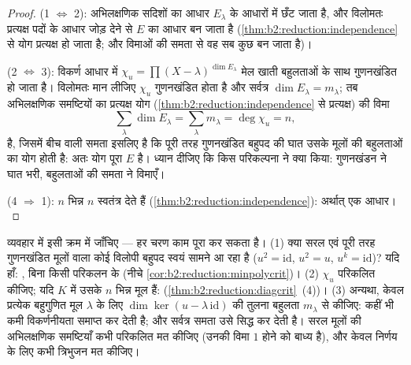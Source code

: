 \begin{proof}
(1 $\iff$ 2): अभिलक्षणिक सदिशों का आधार $E_\lambda$ के आधारों में छँट जाता है,
और विलोमतः प्रत्यक्ष पदों के आधार जोड़ देने से $E$ का आधार बन जाता है
(\cref{thm:b2:reduction:independence} से योग प्रत्यक्ष हो जाता है; और विमाओं की समता से वह सब कुछ बन
जाता है)।

(2 $\iff$ 3): विकर्ण आधार में $\chi_u = \prod (X -
\lambda)^{\dim E_\lambda}$ मेल खाती बहुलताओं के साथ गुणनखंडित हो
जाता है। विलोमतः मान लीजिए $\chi_u$ गुणनखंडित होता है और सर्वत्र $\dim E_\lambda =
m_\lambda$; तब
अभिलक्षणिक समष्टियों का प्रत्यक्ष योग (\cref{thm:b2:reduction:independence} से प्रत्यक्ष) की विमा
\[
\sum_{\lambda}\dim E_\lambda = \sum_{\lambda} m_\lambda =
\deg\chi_u = n ,
\]
है, जिसमें बीच वाली समता इसलिए है कि पूरी तरह गुणनखंडित बहुपद की घात
उसके मूलों की बहुलताओं का योग होती है: अतः योग पूरा $E$ है। ध्यान
दीजिए कि किस परिकल्पना ने क्या किया: गुणनखंडन ने घात भरी, बहुलताओं की
समता ने विमाएँ।

(4 $\Rightarrow$ 1): $n$ भिन्न  $n$ स्वतंत्र  देते
हैं (\cref{thm:b2:reduction:independence}): अर्थात् एक आधार।
\end{proof}

\begin{method}[विकर्णनीयता का निर्णय]\label{met:b2:reduction:decide}
व्यवहार में इसी क्रम में जाँचिए --- हर चरण काम पूरा कर सकता है। (1)
क्या सरल एवं पूरी तरह गुणनखंडित मूलों वाला कोई विलोपी बहुपद स्वयं सामने
आ रहा है ($u^2 = \mathrm{id}$, $u^2 = u$, $u^k =
\mathrm{id}$)? यदि हाँ: , बिना किसी परिकलन के
(नीचे \cref{cor:b2:reduction:minpolycrit})। (2) $\chi_u$ परिकलित कीजिए; यदि $K$ में उसके $n$ भिन्न मूल
हैं:  (\cref{thm:b2:reduction:diagcrit}~(4))। (3) अन्यथा, केवल प्रत्येक बहुगुणित मूल $\lambda$
के लिए $\dim\ker(u -
\lambda\,\mathrm{id})$ की तुलना बहुलता $m_\lambda$ से कीजिए: कहीं भी कमी विकर्णनीयता
समाप्त कर देती है; और सर्वत्र समता उसे सिद्ध कर देती है। सरल मूलों की
अभिलक्षणिक समष्टियाँ कभी परिकलित मत कीजिए (उनकी विमा $1$ होने को
बाध्य है), और केवल निर्णय के लिए कभी त्रिभुजन मत कीजिए।
\end{method}

